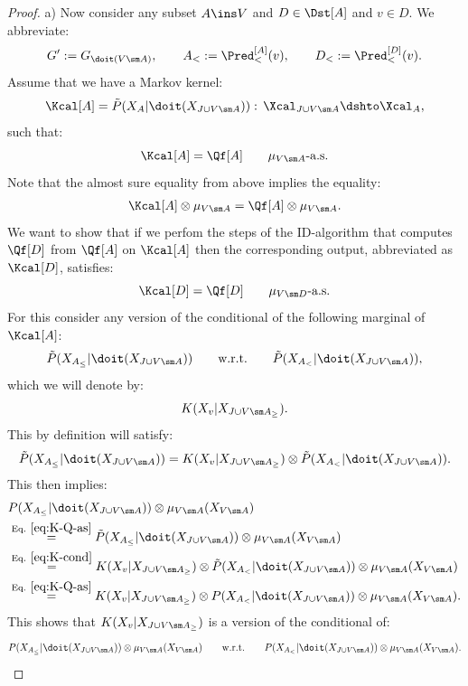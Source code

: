 \begin{Thm}
\begin{proof}
        a) Now consider any subset $A \ins V$ and $D \in \Dst[A]$ and $v \in D$.  We abbreviate:
        \[ G':= G_{\doit(V \sm A)}, \qquad A_<:=\Pred^{[A]}_<(v), \qquad D_<:=\Pred^{[D]}_<(v). \]
         Assume that we have a Markov kernel:
        \[ \Kcal[A]=\tilde P(X_{A}|\doit(X_{J \cup V \sm A})) :\, \Xcal_{J \cup V \sm A} \dshto \Xcal_A,  \]
        such that:
        \[ \Kcal[A] = \Qf[A]\qquad \mu_{V\sm A}\text{-a.s.}  \]
         Note that the almost sure equality from above implies the equality:
        \begin{align}
            \Kcal[A] \otimes \mu_{V\sm A} = \Qf[A]\otimes \mu_{V\sm A}. \label{eq:K-Q-as} 
        \end{align}
        We want to show that if we perfom the steps of the ID-algorithm that computes $\Qf[D]$ from $\Qf[A]$
        on $\Kcal[A]$ then the corresponding output, abbreviated as $\Kcal[D]$, satisfies:
        \[ \Kcal[D] = \Qf[D]\qquad \mu_{V\sm D}\text{-a.s.}  \]
        For this consider any version of the conditional of the following marginal of $\Kcal[A]$:
        \[ \tilde P(X_{A_\le}|\doit(X_{J \cup V \sm A}))  \qquad \text{w.r.t.} \qquad \tilde P(X_{A_<}|\doit(X_{J \cup V \sm A})), \] 
        which we will denote by:
        \[ K(X_v|X_{J \cup V \sm A_\ge}). \]
        This by definition will satisfy:
        \begin{align}
        \tilde P(X_{A_\le}|\doit(X_{J \cup V \sm A})) =  K(X_v|X_{J \cup V \sm A_\ge}) \otimes \tilde P(X_{A_<}|\doit(X_{J \cup V \sm A})).  \label{eq:K-cond}  \end{align}
        This then implies:
        \begin{align*}
           & P(X_{A_\le}|\doit(X_{J \cup V \sm A})) \otimes \mu_{V \sm A}(X_{V \sm A}) \\
           & \stackrel{\text{Eq. }\ref{eq:K-Q-as}}{=} \tilde P(X_{A_\le}|\doit(X_{J \cup V \sm A})) \otimes \mu_{V \sm A}(X_{V \sm A}) \\
           & \stackrel{\text{Eq. }\ref{eq:K-cond}}{=} K(X_v|X_{J \cup V \sm A_\ge}) \otimes \tilde P(X_{A_<}|\doit(X_{J \cup V \sm A})) \otimes \mu_{V \sm A}(X_{V \sm A}) \\
           & \stackrel{\text{Eq. }\ref{eq:K-Q-as}}{=} K(X_v|X_{J \cup V \sm A_\ge}) \otimes  P(X_{A_<}|\doit(X_{J \cup V \sm A})) \otimes \mu_{V \sm A}(X_{V \sm A}).
        \end{align*}
        This shows that $K(X_v|X_{J \cup V \sm A_\ge})$ is a version of the conditional of:
        \[  P(X_{A_\le}|\doit(X_{J \cup V \sm A})) \otimes \mu_{V \sm A}(X_{V \sm A})  \qquad \text{w.r.t.} \qquad  P(X_{A_<}|\doit(X_{J \cup V \sm A})) \otimes \mu_{V \sm A}(X_{V \sm A}). \]

\end{proof}
\end{Thm}
